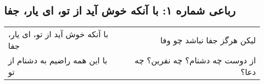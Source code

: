 \begin{center}
\section*{رباعی شماره ۱: با آنکه خوش آید از تو، ای یار، جفا}
\label{sec:001}
\begin{longtable}{l p{0.5cm} r}
با آنکه خوش آید از تو، ای یار، جفا
&&
لیکن هرگز جفا نباشد چو وفا
\\
با این همه راضیم به دشنام از تو
&&
از دوست چه دشنام؟ چه نفرین؟ چه دعا؟
\\
\end{longtable}
\end{center}
